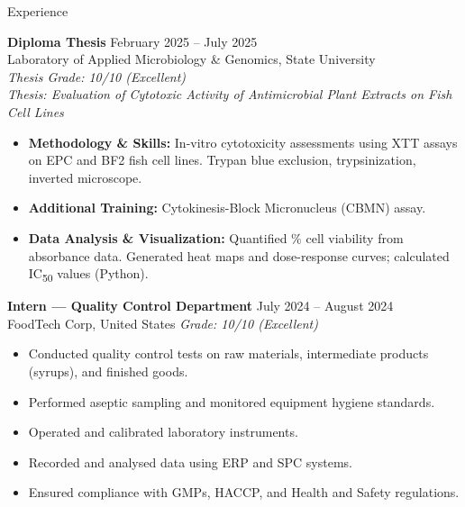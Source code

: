 \documentclass{resume} %
\begin{document}
\begin{rSection}{Experience}

\textbf{Diploma Thesis} \hfill {February 2025 -- July 2025}\\
Laboratory of Applied Microbiology \& Genomics, State University\\
\textit{Thesis Grade: 10/10 (Excellent)}\\
\textit{Thesis: Evaluation of Cytotoxic Activity of Antimicrobial Plant Extracts on Fish Cell Lines}
\smallskip
\begin{itemize}[leftmargin=1em, itemsep=-2pt, topsep=4pt]
  \item \textbf{Methodology \& Skills:} In-vitro cytotoxicity assessments using XTT assays on EPC
        and BF2 fish cell lines. Trypan blue exclusion, trypsinization, inverted microscope.
  \item \textbf{Additional Training:} Cytokinesis-Block Micronucleus (CBMN) assay.
  \item \textbf{Data Analysis \& Visualization:} Quantified \% cell viability from absorbance data.
        Generated heat maps and dose-response curves; calculated IC\textsubscript{50} values (Python).
\end{itemize}

\medskip

\textbf{Intern --- Quality Control Department} \hfill {July 2024 -- August 2024}\\
FoodTech Corp, United States \hfill \textit{Grade: 10/10 (Excellent)}
\smallskip

\begin{itemize}[leftmargin=1em, itemsep=-2pt, topsep=4pt]
  \item Conducted quality control tests on raw materials, intermediate products (syrups), and finished goods.
  \item Performed aseptic sampling and monitored equipment hygiene standards.
  \item Operated and calibrated laboratory instruments.
  \item Recorded and analysed data using ERP and SPC systems.
  \item Ensured compliance with GMPs, HACCP, and Health and Safety regulations.
\end{itemize}

\end{rSection}
\end{document}
